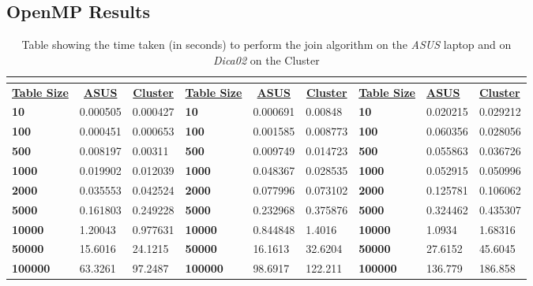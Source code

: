 \documentclass[10pt, conference]{IEEEtran}
\begin{document}
\subsection{OpenMP Results}
\label{sec: OpenMP Results}
\begin{table}[h!]
\centering
\caption{Table showing the time taken (in seconds) to perform the join algorithm on the \emph{ASUS} laptop and on \emph{Dica02} on the Cluster}
\label{tbl: OpenMP}
\begin{tabular}{|l|l|l|l|l|l|l|l|l|}
\hline
\multicolumn{3}{|c|}{\cellcolor[HTML]{C0C0C0}{\ul \textbf{Threads = 0}}} & \multicolumn{3}{c|}{\cellcolor[HTML]{C0C0C0}{\ul \textbf{Threads = 4}}} & \multicolumn{3}{c|}{\cellcolor[HTML]{C0C0C0}{\ul \textbf{Threads = 8}}} \\ \hline
\multicolumn{1}{|c|}{{\ul \textbf{Table Size}}} & \multicolumn{1}{c|}{{\ul \textbf{ASUS}}} & \multicolumn{1}{c|}{{\ul \textbf{Cluster}}} & \multicolumn{1}{c|}{{\ul \textbf{Table Size}}} & \multicolumn{1}{c|}{{\ul \textbf{ASUS}}} & \multicolumn{1}{c|}{{\ul \textbf{Cluster}}} & {\ul \textbf{Table Size}} & {\ul \textbf{ASUS}} & {\ul \textbf{Cluster}} \\ \hline
\textbf{10} & 0.000505 & 0.000427 & \textbf{10} & 0.000691 & 0.00848 & \textbf{10} & 0.020215 & 0.029212 \\ \hline
\textbf{100} & 0.000451 & 0.000653 & \textbf{100} & 0.001585 & 0.008773 & \textbf{100} & 0.060356 & 0.028056 \\ \hline
\textbf{500} & 0.008197 & 0.00311 & \textbf{500} & 0.009749 & 0.014723 & \textbf{500} & 0.055863 & 0.036726 \\ \hline
\textbf{1000} & 0.019902 & 0.012039 & \textbf{1000} & 0.048367 & 0.028535 & \textbf{1000} & 0.052915 & 0.050996 \\ \hline
\textbf{2000} & 0.035553 & 0.042524 & \textbf{2000} & 0.077996 & 0.073102 & \textbf{2000} & 0.125781 & 0.106062 \\ \hline
\textbf{5000} & 0.161803 & 0.249228 & \textbf{5000} & 0.232968 & 0.375876 & \textbf{5000} & 0.324462 & 0.435307 \\ \hline
\textbf{10000} & 1.20043 & 0.977631 & \textbf{10000} & 0.844848 & 1.4016 & \textbf{10000} & 1.0934 & 1.68316 \\ \hline
\textbf{50000} & 15.6016 & 24.1215 & \textbf{50000} & 16.1613 & 32.6204 & \textbf{50000} & 27.6152 & 45.6045 \\ \hline
\textbf{100000} & 63.3261 & 97.2487 & \textbf{100000} & 98.6917 & 122.211 & \textbf{100000} & 136.779 & 186.858 \\ \hline

\end{tabular}
\end{table}
\end{document}
